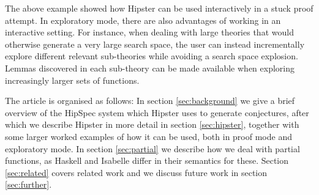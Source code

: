 

% 
The above example showed how Hipster can be used interactively in a stuck proof attempt. In exploratory mode, there are also advantages of working in an interactive setting. For instance, when dealing with large theories that would otherwise generate a very large search space, the user can instead incrementally explore different relevant sub-theories while avoiding a search space explosion. Lemmas discovered in each sub-theory can be made available when exploring increasingly larger sets of functions. 

The article is organised as follows: In section \ref{sec:background} we give a brief overview of the HipSpec system which Hipster uses to generate conjectures, after which we describe Hipster in more detail in section \ref{sec:hipster}, together with some larger worked examples of how it can be used, both in proof mode and exploratory mode. In section \ref{sec:partial} we describe how we deal with partial functions, as Haskell and Isabelle differ in their semantics for these. Section \ref{sec:related} covers related work and we discuss future work in section \ref{sec:further}.
